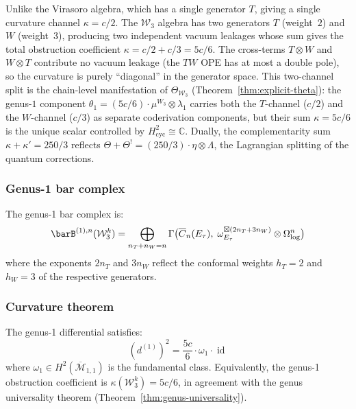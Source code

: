 Unlike the Virasoro algebra, which has a single generator $T$, giving a single
curvature channel $\kappa = c/2$.  The $\mathcal{W}_3$ algebra has two
generators $T$ (weight~$2$) and $W$ (weight~$3$), producing two
independent vacuum leakages whose sum gives the total obstruction
coefficient $\kappa = c/2 + c/3 = 5c/6$.  The cross-terms
$T \otimes W$ and $W \otimes T$ contribute no vacuum leakage
(the $TW$ OPE has at most a double pole), so the curvature is
purely ``diagonal'' in the generator space.
This two-channel split is the chain-level manifestation of
$\Theta_{\mathcal{W}_3}$ (Theorem~\ref{thm:explicit-theta}):
the genus-$1$ component $\theta_1 = (5c/6) \cdot \mu^{W_3}
\otimes \lambda_1$ carries both the $T$-channel ($c/2$) and the
$W$-channel ($c/3$) as separate coderivation components,
but their sum $\kappa = 5c/6$ is the unique scalar
controlled by $H^2_{\mathrm{cyc}} \cong \mathbb{C}$.
Dually, the complementarity sum $\kappa + \kappa' = 250/3$
reflects $\Theta + \Theta^! = (250/3) \cdot \eta \otimes \Lambda$,
the Lagrangian splitting of the quantum corrections.

\subsubsection{Genus-1 bar complex}

The genus-1 bar complex is:
\begin{equation}\label{eq:w3-genus1-bar}
\barB^{(1),n}(\mathcal{W}_3^k) = \bigoplus_{n_T + n_W = n}
  \Gamma\bigl(\overline{C}_n(E_\tau),\;
  \omega_{E_\tau}^{\boxtimes(2n_T + 3n_W)} \otimes \Omega^n_{\log}\bigr)
\end{equation}
where the exponents $2n_T$ and $3n_W$ reflect the conformal weights
$h_T = 2$ and $h_W = 3$ of the respective generators.

\subsubsection{Curvature theorem}

\begin{theorem}
\label{thm:w3-genus1-curvature}
The genus-1 differential satisfies:
\begin{equation}\label{eq:w3-genus1-dsquared}
(d^{(1)})^2 = \frac{5c}{6} \cdot \omega_1 \cdot \operatorname{id}
\end{equation}
where $\omega_1 \in H^2(\overline{\mathcal{M}}_{1,1})$ is the fundamental
class.  Equivalently, the genus-1 obstruction coefficient is
$\kappa(\mathcal{W}_3^k) = 5c/6$, in agreement with the genus universality
theorem (Theorem~\ref{thm:genus-universality}).
\end{theorem}

